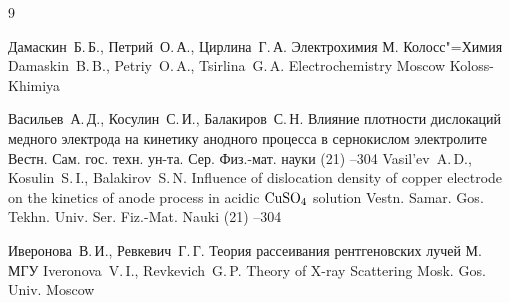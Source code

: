\begin{thebibliography}{9}

\by Дамаскин~Б.\,Б., Петрий~О.\,А., Цирлина~Г.\,А.
\book Электрохимия
\publaddr М.
\publ Колосс"=Химия
\misctransl
\by Damaskin~B.\,B., Petriy~O.\,A., Tsirlina~G.\,A.  
\book Electrochemistry
\publaddr Moscow
\publ Koloss-Khimiya

\by Васильев~А.\,Д., Косулин~С.\,И., Балакиров~С.\,Н.
\paper Влияние плотности дислокаций медного электрода на кинетику анодного процесса в сернокислом электролите
\jour Вестн. Сам. гос. техн. ун-та. Сер. Физ.-мат. науки
(21)
--304
\misctransl
\by Vasil'ev~A.\,D., Kosulin~S.\,I., Balakirov~S.\,N.
\paper Influence of dislocation density of copper electrode on the kinetics of anode process in acidic $\rm CuSO_4$ solution
\jour Vestn. Samar. Gos. Tekhn. Univ. Ser. Fiz.-Mat. Nauki
(21)
--304



\by Иверонова~В.\,И., Ревкевич~Г.\,Г.
\book Теория рассеивания рентгеновских лучей
\publaddr М.
\publ МГУ
\misctransl
\by Iveronova~V.\,I., Revkevich~G.\,P.
\book Theory of X-ray Scattering 
\publ Mosk. Gos. Univ.
\publaddr Moscow

\end{thebibliography}

\noindent
\hskip6.5cm \thedate \par\noindent
\hskip6.5cm\therevdate


\makeengtitlem



 \newpage
%
%
%
